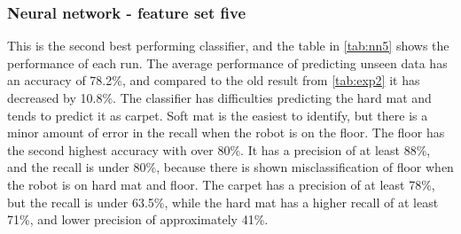 \documentclass[USenglish]{ifimaster}  %
\begin{document}
\subsubsection{Neural network - feature set five}
This is the second best performing classifier, and the table in \ref{tab:nn5} shows the performance of each run. The average performance of predicting unseen data has an accuracy of 78.2\%, and compared to the old result from \ref{tab:exp2} it has decreased by 10.8\%. The classifier has difficulties predicting the hard mat and tends to predict it as carpet. Soft mat is the easiest to identify, but there is a minor amount of error in the recall when the robot is on the floor. The floor has the second highest accuracy with over 80\%. It has a precision of at least 88\%, and the recall is under 80\%, because there is shown misclassification of floor when the robot is on hard mat and floor. The carpet has a precision of at least 78\%, but the recall is under 63.5\%, while the hard mat has a higher recall of at least 71\%, and lower precision of approximately 41\%.
\end{document}
